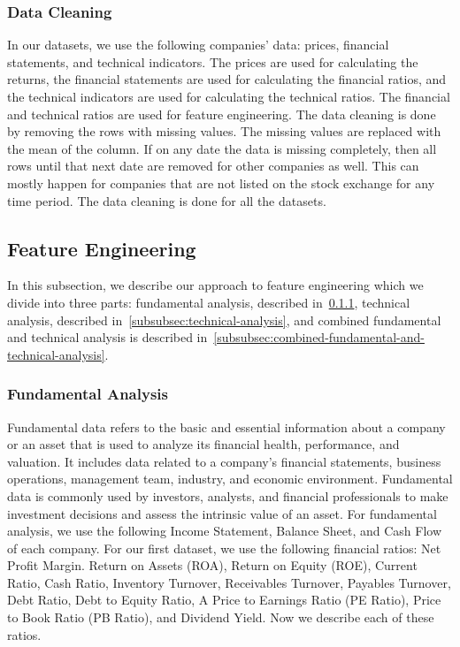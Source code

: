 \documentclass[../xlapes02]{subfiles}
\begin{document}
    \subsubsection{Data Cleaning}\label{subsubsec:data-cleaning}
    In our datasets, we use the following companies' data: prices, financial statements, and technical indicators. The prices are used for calculating the returns, the financial statements are used for calculating the financial ratios, and the technical indicators are used for calculating the technical ratios. The financial and technical ratios are used for feature engineering. The data cleaning is done by removing the rows with missing values. The missing values are replaced with the mean of the column. If on any date the data is missing completely, then all rows until that next date are removed for other companies as well. This can mostly happen for companies that are not listed on the stock exchange for any time period. The data cleaning is done for all the datasets.

    \subsection{Feature Engineering}\label{subsubsec:feature-engineering}
    In this subsection, we describe our approach to feature engineering which we divide into three parts: fundamental analysis, described in~\cref{subsubsec:fundamental-analysis}, technical analysis, described in~\cref{subsubsec:technical-analysis}, and combined fundamental and technical analysis is described in~\cref{subsubsec:combined-fundamental-and-technical-analysis}.

    \subsubsection{Fundamental Analysis}\label{subsubsec:fundamental-analysis}
    Fundamental data refers to the basic and essential information about a company or an asset that is used to analyze its financial health, performance, and valuation. It includes data related to a company's financial statements, business operations, management team, industry, and economic environment. Fundamental data is commonly used by investors, analysts, and financial professionals to make investment decisions and assess the intrinsic value of an asset. For fundamental analysis, we use the following Income Statement, Balance Sheet, and Cash Flow of each company. For our first dataset, we use the following financial ratios: Net Profit Margin. Return on Assets (ROA), Return on Equity (ROE), Current Ratio, Cash Ratio, Inventory Turnover, Receivables Turnover, Payables Turnover, Debt Ratio, Debt to Equity Ratio, A Price to Earnings Ratio (PE Ratio), Price to Book Ratio (PB Ratio), and Dividend Yield. Now we describe each of these ratios.
\end{document}
